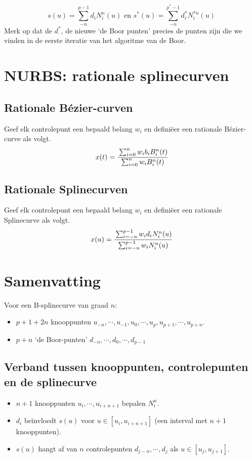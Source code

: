 \documentclass[computergesteund_ontwerp_van_curven_en_oppervlakken.tex]{subfiles}
\begin{document}
\[
s(u) = \sum_{-n}^{p-1}d_iN_{i}^{n}(u) \text{ en } s^{*}(u) = \sum_{-n}^{p^{*}-1}d^{*}_iN_{i}^{*n}(u) 
\]
Merk op dat de $d_{\cdot}^{*}$, de nieuwe `de Boor punten' precies de punten zijn die we vinden in de eerste iteratie van het algoritme van de Boor.

\section{NURBS: rationale splinecurven}
\subsection{Rationale B\'ezier-curven}
Geef elk controlepunt een bepaald belang $w_i$ en defini\"eer een rationale B\'ezier-curve als volgt.
\begin{equation}
x(t) = \cfrac{\sum_{i=0}^{n}w_ib_iB_{i}^{n}(t)}{\sum_{i=0}^{n}w_iB_{i}^{n}(t)}
\end{equation}

\subsection{Rationale Splinecurven}
Geef elk controlepunt een bepaald belang $w_i$ en defini\"eer een rationale Splinecurve als volgt.
\[
x(u) = \cfrac{\sum_{i=-n}^{p-1}w_id_iN_{i}^{n}(u)}{\sum_{i=-n}^{p-1}w_iN_{i}^{n}(u)}
\]

\section{Samenvatting}
Voor een B-splinecurve van graad $n$:
\begin{itemize}
\item $p+1+2n$ knooppunten $u_{-n},\cdots,u_{-1},u_{0},\cdots,u_{p},u_{p+1},\cdots,u_{p+n}$.
\item $p+n$ `de Boor-punten' $d_{-n},\cdots,d_{0},\cdots,d_{p-1}$
\end{itemize}

\subsection{Verband tussen knooppunten, controlepunten en de splinecurve}
\begin{itemize}
\item $n+1$ knooppunten $u_{i},\cdots,u_{i+n+1}$ bepalen $N_{i}^{n}$.
\item $d_i$ be\"invloedt $s(u)$ voor $u\in [u_i,u_{i+n+1}]$ (een interval met $n+1$ knooppunten).
\item $s(u)$ hangt af van $n$ controlepunten $d_{j-n},\cdots,d_{j}$ als $u\in [u_{j},u_{j+1}]$.
\end{itemize}
\end{document}

